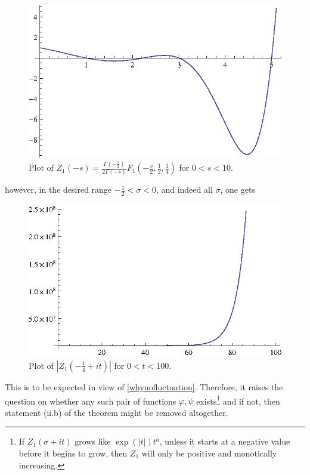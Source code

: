 \documentclass[11pt]{article}
\numberwithin{equation}{section}		 			%
\numberwithin{figure}{section}			 			%
\begin{document}
\begin{figure}[H]
	\centering
		\includegraphics{PlotsRiemannH_gr1.eps}
	\caption{Plot of ${Z_1}( - s) = \frac{{\Gamma ( - \tfrac{s}{2})}}{{2\Gamma ( - s)}}{F_1}\left( { - \frac{s}{2},\frac{1}{2},\frac{1}{4}} \right)$ for $0 < s < 10$.}
\end{figure}
\noindent however, in the desired range $-\tfrac{1}{2}<\sigma<0$, and indeed all $\sigma$, one gets
\begin{figure}[H]
	\centering
		\includegraphics{PlotsRiemannH_gr2.eps}
	\caption{Plot of $\left| {{Z_1}( - \tfrac{1}{4} + it)} \right|$ for $0 < t <100$.}
\end{figure}
\noindent This is to be expected in view of \eqref{whynofluctuation}. Therefore, it raises the question on whether any such pair of functions $\varphi, \psi$ exists\footnote{If $Z_1(\sigma + it)$ grows like $\exp(|t|)t^a$, unless it starts at a negative value before it begins to grow, then $Z_1$ will only be positive and monotically increasing.} and if not, then statement (ii.b) of the theorem might be removed altogether.
\end{document}
